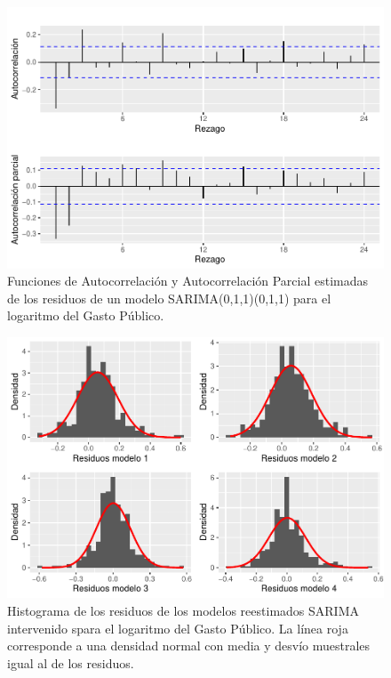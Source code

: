 \documentclass[
  12pt,
]{article}
\begin{document}
\begin{figure}[H]

{\centering \includegraphics[width=0.75\linewidth]{informe_files/figure-latex/unnamed-chunk-33-1} 

}

\caption{\label{facyp_r4} Funciones de Autocorrelación y Autocorrelación Parcial estimadas de los residuos de un modelo SARIMA(0,1,1)(0,1,1) para el logaritmo del Gasto Público.}\label{fig:unnamed-chunk-33}
\end{figure}

\begin{figure}[H]

{\centering \includegraphics[width=0.75\linewidth]{informe_files/figure-latex/unnamed-chunk-34-1} 

}

\caption{\label{norms} Histograma de los residuos de los modelos reestimados SARIMA intervenido spara el logaritmo del Gasto Público. La línea roja corresponde a una densidad normal con media y desvío muestrales igual al de los residuos.}\label{fig:unnamed-chunk-34}
\end{figure}
\end{document}
